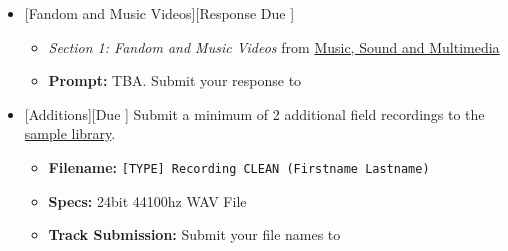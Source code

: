 \begin{itemize}[noitemsep,topsep=0pt,leftmargin=*]
\item {}[Fandom and Music Videos][Response Due \dMon]
\begin{itemize}
	\item \emph{Section 1: Fandom and Music Videos} from \href{supplements/Music_Sound_and_Multimedia_-_From_the_Live_to_the_Virtual_(Music_and_the_Moving_Image)_(2008).pdf}{Music, Sound and Multimedia}
	\item \textbf{Prompt:} TBA. Submit your response to \discordR
\end{itemize}
\item {}[Additions][Due \dSun] \newline 
 Submit a minimum of 2 additional field recordings to the \href{\#}{sample library}.
\begin{itemize}
	\item \textbf{Filename:} \texttt{[TYPE] Recording CLEAN (Firstname Lastname)}
	\item \textbf{Specs:} 24bit 44100hz WAV File
	\item \textbf{Track Submission:} Submit your file names to \discordS
\end{itemize}
\end{itemize}